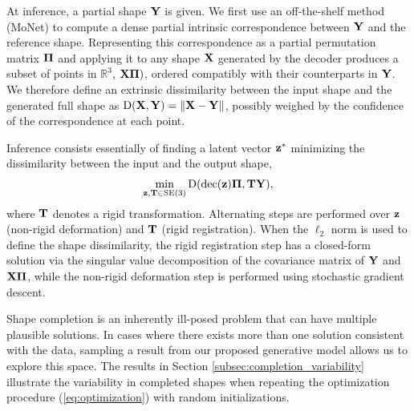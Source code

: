 At inference, a partial shape $\bm{\mathrm{Y}}$ is given. We first use an off-the-shelf method (MoNet) \cite{monet} to compute a dense  partial intrinsic correspondence between $\bm{\mathrm{Y}}$ and the reference shape. Representing this correspondence as a partial permutation matrix $\bm{\mathrm{\Pi}}$ and applying it to any shape $\bm{\mathrm{X}}$ generated by the decoder produces a subset of points in $\mathbb{R}^3$, $\bm{\mathrm{X}} \bm{\mathrm{\Pi}} )$, ordered compatibly with their counterparts in $\bm{\mathrm{Y}}$. 
%
We therefore define an extrinsic dissimilarity between the input shape and the generated full shape as
$\mathrm{D}(\bm{\mathrm{X}},\bm{\mathrm{Y}}) =  \| \bm{\mathrm{X}} - \bm{\mathrm{Y}} \|$, possibly weighed by the confidence of the correspondence at each point. 

Inference consists essentially of finding a latent vector $\bm{\mathrm{z}}^\ast$ minimizing the dissimilarity between the input and the output shape,
\begin{eqnarray}
\min_{\bm{\mathrm{z}}, \bm{\mathrm{T}} \in \mathrm{SE}(3)} \mathrm{D}(\mathrm{dec}(\bm{\mathrm{z}}) \bm{\mathrm{\Pi}}, \bm{\mathrm{T}} \bm{\mathrm{Y}} ),
\label{eq:optimization}
\end{eqnarray}
where $\bm{\mathrm{T}}$ denotes a rigid transformation. Alternating steps are performed over $\bm{\mathrm{z}}$ (non-rigid deformation) and $\bm{\mathrm{T}}$ (rigid registration). When the $\ell_2$ norm is used to define the shape dissimilarity, the rigid registration step has a closed-form solution via the singular value decomposition of the covariance matrix of $\bm{\mathrm{Y}}$ and $\bm{\mathrm{X}}\bm{\mathrm{\Pi}}$, while the non-rigid deformation step is performed using stochastic gradient descent.

Shape completion is an inherently ill-posed problem that can have multiple plausible solutions. In cases where there exists more than one solution consistent with the data, sampling a result from our proposed generative model allows us to explore this space. The results in Section \ref{subsec:completion_variability} illustrate the variability in completed shapes when repeating the optimization procedure (\ref{eq:optimization}) with random initializations.
